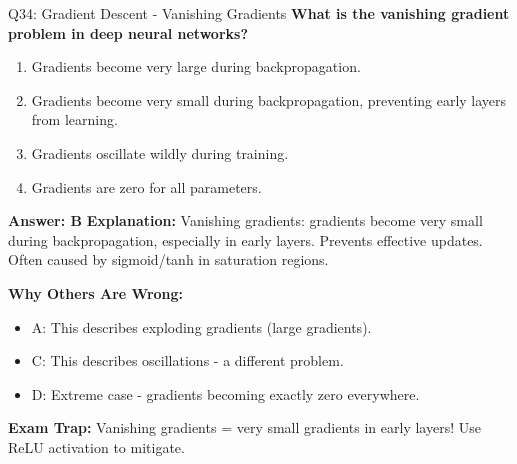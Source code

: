 \documentclass[8pt]{beamer}
\begin{document}
	\begin{frame}{Q34: Gradient Descent - Vanishing Gradients}
		\fontsize{6.5}{7.5}\selectfont
		\textbf{What is the vanishing gradient problem in deep neural networks?}
		
		\begin{enumerate}
			\item Gradients become very large during backpropagation.
			\item Gradients become very small during backpropagation, preventing early layers from learning.
			\item Gradients oscillate wildly during training.
			\item Gradients are zero for all parameters.
		\end{enumerate}
		
		\vspace{0.05cm}
		\textcolor{myblue}{\textbf{Answer: B}}
		\vspace{0.05cm}
		\textcolor{myblue}{\textbf{Explanation:}} Vanishing gradients: gradients become very small during backpropagation, especially in early layers. Prevents effective updates. Often caused by sigmoid/tanh in saturation regions.
		
		\vspace{0.05cm}
		\textcolor{myred}{\textbf{Why Others Are Wrong:}}
		\begin{itemize}
			\item \textcolor{myred}{A:} This describes exploding gradients (large gradients).
			\item \textcolor{myred}{C:} This describes oscillations - a different problem.
			\item \textcolor{myred}{D:} Extreme case - gradients becoming exactly zero everywhere.
		\end{itemize}
		
		\textcolor{myred}{\textbf{Exam Trap:}} Vanishing gradients = \textcolor{myblue}{very small gradients} in early layers! Use ReLU activation to mitigate.
	\end{frame}
	
\end{document}
